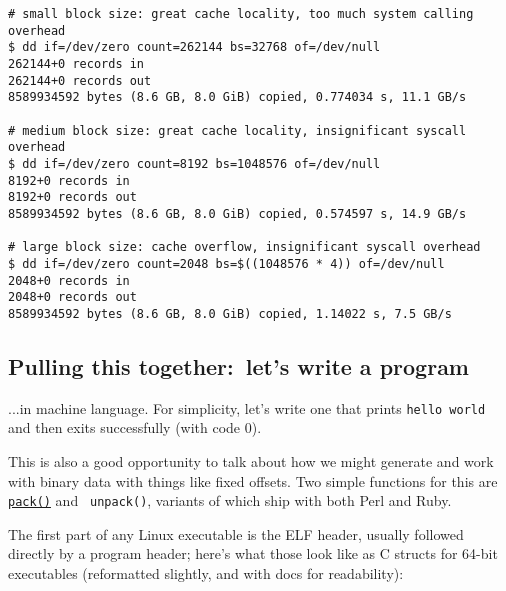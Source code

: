 \documentclass{article}
\newcommand{\lnk}[2]{\href{#1}{\textcolor[rgb]{1.0,0.0,0.0}{#2}}}
\begin{document}
  \begin{verbatim}
# small block size: great cache locality, too much system calling overhead
$ dd if=/dev/zero count=262144 bs=32768 of=/dev/null
262144+0 records in
262144+0 records out
8589934592 bytes (8.6 GB, 8.0 GiB) copied, 0.774034 s, 11.1 GB/s

# medium block size: great cache locality, insignificant syscall overhead
$ dd if=/dev/zero count=8192 bs=1048576 of=/dev/null
8192+0 records in
8192+0 records out
8589934592 bytes (8.6 GB, 8.0 GiB) copied, 0.574597 s, 14.9 GB/s

# large block size: cache overflow, insignificant syscall overhead
$ dd if=/dev/zero count=2048 bs=$((1048576 * 4)) of=/dev/null
2048+0 records in
2048+0 records out
8589934592 bytes (8.6 GB, 8.0 GiB) copied, 1.14022 s, 7.5 GB/s
  \end{verbatim}

  \subsection{Pulling this together:~let's write a program}
  ...in machine language. For simplicity, let's write one that prints {\tt hello
  world} and then exits successfully (with code 0).

  This is also a good opportunity to talk about how we might generate and work
  with binary data with things like fixed offsets. Two simple functions for this
  are \lnk{https://perldoc.perl.org/perlpacktut.html}{\tt pack()} and {\tt
  unpack()}, variants of which ship with both Perl and Ruby.

  The first part of any Linux executable is the ELF header, usually followed
  directly by a program header; here's what those look like as C structs for
  64-bit executables (reformatted slightly, and with docs for readability):
\end{document}
